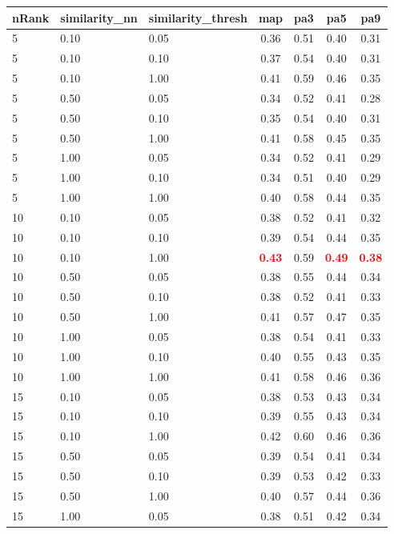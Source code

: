   
\begin{table} 
\begin{center} 
\scriptsize 
 \setlength{\tabcolsep}{.16667em} 
\begin{tabular}{lllcccc} 
nRank & similarity\_nn & similarity\_thresh & map & pa3 & pa5 & pa9 \\ 
\hline 
 5 & 0.10 & 0.05 & 0.36 & 0.51 & 0.40 & 0.31 \\ 
 5 & 0.10 & 0.10 & 0.37 & 0.54 & 0.40 & 0.31 \\ 
 5 & 0.10 & 1.00 & 0.41 & 0.59 & 0.46 & 0.35 \\ 
 5 & 0.50 & 0.05 & 0.34 & 0.52 & 0.41 & 0.28 \\ 
 5 & 0.50 & 0.10 & 0.35 & 0.54 & 0.40 & 0.31 \\ 
 5 & 0.50 & 1.00 & 0.41 & 0.58 & 0.45 & 0.35 \\ 
 5 & 1.00 & 0.05 & 0.34 & 0.52 & 0.41 & 0.29 \\ 
 5 & 1.00 & 0.10 & 0.34 & 0.51 & 0.40 & 0.29 \\ 
 5 & 1.00 & 1.00 & 0.40 & 0.58 & 0.44 & 0.35 \\ 
10 & 0.10 & 0.05 & 0.38 & 0.52 & 0.41 & 0.32 \\ 
10 & 0.10 & 0.10 & 0.39 & 0.54 & 0.44 & 0.35 \\ 
10 & 0.10 & 1.00 & \textbf{\textcolor{red}{0.43}} & 0.59 & \textbf{\textcolor{red}{0.49}} & \textbf{\textcolor{red}{0.38}} \\ 
10 & 0.50 & 0.05 & 0.38 & 0.55 & 0.44 & 0.34 \\ 
10 & 0.50 & 0.10 & 0.38 & 0.52 & 0.41 & 0.33 \\ 
10 & 0.50 & 1.00 & 0.41 & 0.57 & 0.47 & 0.35 \\ 
10 & 1.00 & 0.05 & 0.38 & 0.54 & 0.41 & 0.33 \\ 
10 & 1.00 & 0.10 & 0.40 & 0.55 & 0.43 & 0.35 \\ 
10 & 1.00 & 1.00 & 0.41 & 0.58 & 0.46 & 0.36 \\ 
15 & 0.10 & 0.05 & 0.38 & 0.53 & 0.43 & 0.34 \\ 
15 & 0.10 & 0.10 & 0.39 & 0.55 & 0.43 & 0.34 \\ 
15 & 0.10 & 1.00 & 0.42 & 0.60 & 0.46 & 0.36 \\ 
15 & 0.50 & 0.05 & 0.39 & 0.54 & 0.41 & 0.34 \\ 
15 & 0.50 & 0.10 & 0.39 & 0.53 & 0.42 & 0.33 \\ 
15 & 0.50 & 1.00 & 0.40 & 0.57 & 0.44 & 0.36 \\ 
15 & 1.00 & 0.05 & 0.38 & 0.51 & 0.42 & 0.34 \\ 

\end{tabular}
\end{center}
\end{table}
